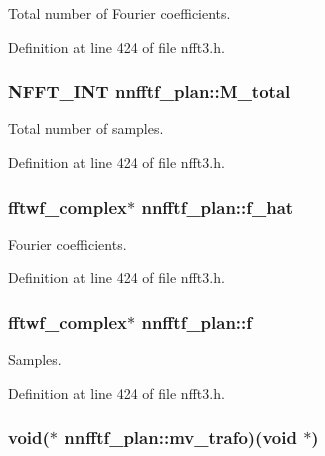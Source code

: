Total number of Fourier coefficients. 



Definition at line 424 of file nfft3.\-h.

\hypertarget{structnnfftf__plan_a95388092377754680ed77c8d6a087be4}{
\subsubsection[{M\-\_\-total}]{\setlength{\rightskip}{0pt plus 5cm}N\-F\-F\-T\-\_\-\-I\-N\-T nnfftf\-\_\-plan\-::\-M\-\_\-total}}\label{structnnfftf__plan_a95388092377754680ed77c8d6a087be4}


Total number of samples. 



Definition at line 424 of file nfft3.\-h.

\hypertarget{structnnfftf__plan_a068de2b177ffaad5b0091b0ecd2ca211}{
\subsubsection[{f\-\_\-hat}]{\setlength{\rightskip}{0pt plus 5cm}fftwf\-\_\-complex$\ast$ nnfftf\-\_\-plan\-::f\-\_\-hat}}\label{structnnfftf__plan_a068de2b177ffaad5b0091b0ecd2ca211}


Fourier coefficients. 



Definition at line 424 of file nfft3.\-h.

\hypertarget{structnnfftf__plan_a458403c21a1083ede0d84a6d25c8cc8c}{
\subsubsection[{f}]{\setlength{\rightskip}{0pt plus 5cm}fftwf\-\_\-complex$\ast$ nnfftf\-\_\-plan\-::f}}\label{structnnfftf__plan_a458403c21a1083ede0d84a6d25c8cc8c}


Samples. 



Definition at line 424 of file nfft3.\-h.

\hypertarget{structnnfftf__plan_aea4c2210478af70a540da01e0c0a1c7b}{
\subsubsection[{mv\-\_\-trafo}]{\setlength{\rightskip}{0pt plus 5cm}void($\ast$ nnfftf\-\_\-plan\-::mv\-\_\-trafo)(void $\ast$)}}\label{structnnfftf__plan_aea4c2210478af70a540da01e0c0a1c7b}


